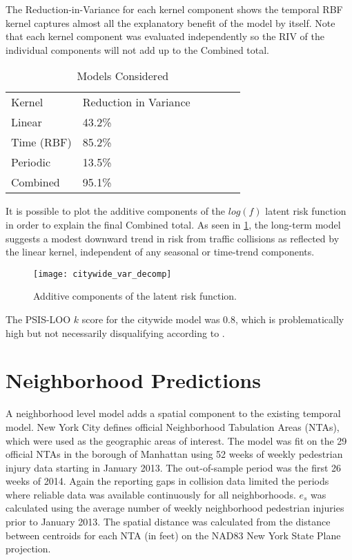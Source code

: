 The Reduction-in-Variance for each kernel component shows the temporal RBF kernel captures almost all the explanatory benefit of the model by itself. Note that each kernel component was evaluated independently so the RIV of the individual components will not add up to the Combined total. \par

\begin{table}[h!]
\centering
\caption{Models Considered}
\label{variance_citywide}
\begin{tabular}{@{}llllll@{}}
\toprule
Kernel     & Reduction in Variance &  \\
Linear     & 43.2\%                &  \\
Time (RBF) & 85.2\%                &  \\
Periodic   & 13.5\%                &  \\
Combined   & 95.1\%                &
\end{tabular}
\end{table}

It is possible to plot the additive components of the $log(f)$ latent risk function in order to explain the final Combined total. As seen in \ref{citywide_var_decomp}, the long-term model suggests a modest downward trend in risk from traffic collisions as reflected by the linear kernel, independent of any seasonal or time-trend components. \par

\begin{figure}[h!]
  \centering
  \caption{Additive components of the latent risk function.}
  \label{citywide_var_decomp}
  \texttt{[image: citywide\_var\_decomp]}
\end{figure}

The PSIS-LOO $k$ score for the citywide model was 0.8, which is problematically high but not necessarily disqualifying according to \cite{vehtari_loo}.

 \section{Neighborhood Predictions}

 A neighborhood level model adds a spatial component to the existing temporal model.  New York City defines official Neighborhood Tabulation Areas (NTAs), which were used as the geographic areas of interest. The model was fit on the 29 official NTAs in the borough of Manhattan using 52 weeks of weekly pedestrian injury data starting in January 2013. The out-of-sample period was the first 26 weeks of 2014. Again the reporting gaps in collision data limited the periods where reliable data was available continuously for all neighborhoods. $e_s$ was calculated using the average number of weekly neighborhood pedestrian injuries prior to January 2013.  The spatial distance was calculated from the distance between centroids for each NTA (in feet) on the NAD83 New York State Plane projection. \par

